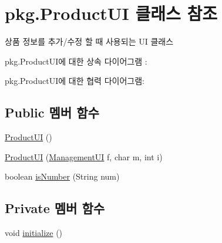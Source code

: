 \hypertarget{classpkg_1_1_product_u_i}{}\section{pkg.\+Product\+UI 클래스 참조}
\label{classpkg_1_1_product_u_i}


상품 정보를 추가/수정 할 때 사용되는 UI 클래스  




pkg.\+Product\+U\+I에 대한 상속 다이어그램 \+: 


pkg.\+Product\+U\+I에 대한 협력 다이어그램\+:
\subsection*{Public 멤버 함수}
\begin{DoxyCompactItemize}
\item 
\hyperlink{classpkg_1_1_product_u_i_a1db60509d7b5f175029369d99d4b9cbf}{Product\+UI} ()
\item 
\hyperlink{classpkg_1_1_product_u_i_a12c84d785c6de1bb64d3ee8f338f2976}{Product\+UI} (\hyperlink{classpkg_1_1_management_u_i}{Management\+UI} f, char m, int i)
\item 
boolean \hyperlink{classpkg_1_1_product_u_i_a643538618cd15aa1607227e9f398554b}{is\+Number} (String num)
\end{DoxyCompactItemize}
\subsection*{Private 멤버 함수}
\begin{DoxyCompactItemize}
\item 
void \hyperlink{classpkg_1_1_product_u_i_a48ca25718eac33d3a3cc576863b9ba48}{initialize} ()
\end{DoxyCompactItemize}
